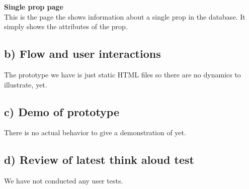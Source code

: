 \documentclass[12pt]{article}
\begin{document}
\newline
\textbf{Single prop page}\\
This is the page the shows information about a single prop in the database. It simply shows the attributes of the prop.
\subsection{b) Flow and user interactions}
The prototype we have is just static HTML files so there are no dynamics to illustrate, yet.
\subsection{c) Demo of prototype}
There is no actual behavior to give a demonstration of yet.
\subsection{d) Review of latest think aloud test}
We have not conducted any user tests.
\end{document}
